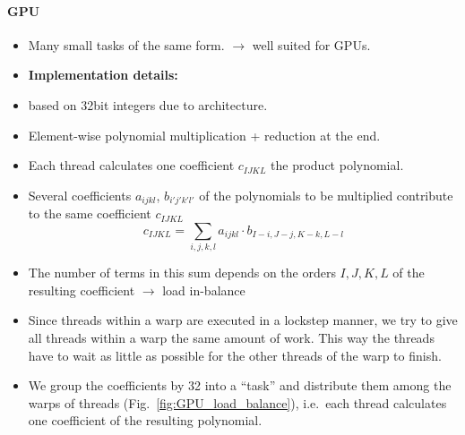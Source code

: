 \documentclass[oribibl]{llncs2e/llncs}
\begin{document}
\paragraph{GPU}
\begin{itemize}
\item Many small tasks of the same form. $\rightarrow$ well suited for GPUs.
\item {\bf Implementation details:}
\item based on 32bit integers due to architecture.
\item Element-wise polynomial multiplication + reduction at the end.
\item Each thread calculates one coefficient $c_{IJKL}$ the product polynomial.
\item Several coefficients $a_{ijkl}$, $b_{i'j'k'l'}$ of the polynomials to be multiplied contribute to the same coefficient $c_{IJKL}$
\begin{equation}
    c_{IJKL} = \sum_{i,j,k,l} a_{ijkl} \cdot b_{I-i,J-j,K-k,L-l}
\end{equation}
\item The number of terms in this sum depends on the orders $I,J,K,L$ of the resulting coefficient $\rightarrow$ load in-balance
\item Since threads within a warp are executed in a lockstep manner, we try to give all threads within a warp the same amount of work. This way the threads have to wait as little as possible for the other threads of the warp to finish.
\item We group the coefficients by 32 into a ``task'' and distribute them among the warps of threads (Fig.\ \ref{fig:GPU_load_balance}), i.e.\ each thread calculates one coefficient of the resulting polynomial.
\begin{figure}[t]
    \begin{center}
    \mbox{
}
\end{center}
\end{figure}
\end{itemize}
\end{document}
